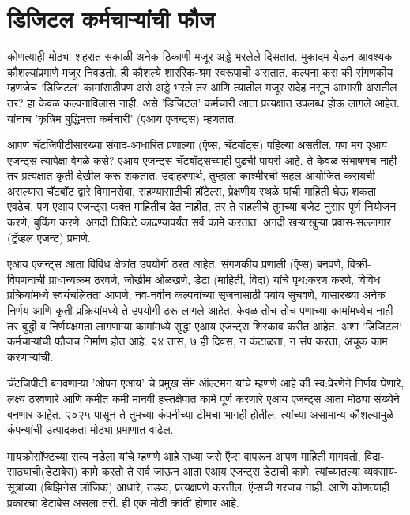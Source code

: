\chapter{डिजिटल कर्मचाऱ्यांची फौज}

कोणत्याही मोठ्या शहरात सकाळी अनेक ठिकाणी मजूर-अड्डे भरलेले दिसतात. मुकादम येऊन आवश्यक कौशल्यांप्रमाणे मजूर निवडतो. ही कौशल्ये शाररिक-श्रम स्वरूपाची असतात. कल्पना करा की संगणकीय म्हणजेच 'डिजिटल' कामांसाठीपण असे अड्डे भरले तर आणि त्यातील मजूर सदेह  नसून आभासी असतील तर? हा केवळ कल्पनाविलास  नाही. असे 'डिजिटल' कर्मचारी आता प्रत्यक्षात उपलब्ध होऊ लागले आहेत. यांनाच 'कृत्रिम बुद्धिमत्ता कर्मचारी' (एआय एजन्ट्स) म्हणतात. 

आपण चॅटजिपीटीसारख्या संवाद-आधारित प्रणाल्या (ऍप्स, चॅटबॉट्स) पहिल्या असतील. पण मग एआय एजन्ट्स त्यापेक्षा वेगळे कसे? एआय एजन्ट्स चॅटबॉट्सच्याही पुढची पायरी आहे. ते केवळ संभाषणच नाही तर प्रत्यक्षात कृती देखील करू शकतात. उदाहरणार्थ, तुम्हाला काश्मीरची सहल आयोजित करायची असल्यास चॅटबॉट द्वारे विमानसेवा, राहण्यासाठीची हॉटेल्स, प्रेक्षणीय स्थळे यांची माहिती घेऊ शकता एवढेच. पण एआय एजन्ट्स फक्त माहितीच देत नाहीत, तर ते सहलीचे तुमच्या बजेट नुसार पूर्ण नियोजन करणे, बुकिंग करणे, अगदी तिकिटे काढण्यापर्यंत सर्व कामे करतात. अगदी खऱ्याखुऱ्या प्रवास-सल्लागार (ट्रॅव्हल एजन्ट) प्रमाणे. 

एआय एजन्ट्स  आता विविध क्षेत्रांत उपयोगी ठरत आहेत. संगणकीय प्रणाली (ऍप्स) बनवणे, विक्री-विपणनाची प्राधान्यक्रम ठरवणे, जोखीम ओळखणे, डेटा (माहिती, विदा) यांचे पृथ:करण करणे, विविध प्रक्रियांमध्ये स्वयंचलितता आणणे, नव-नवीन कल्पनांच्या सृजनासाठी पर्याय सुचवणे, यासारख्या अनेक निर्णय आणि कृती प्रक्रियांमध्ये ते उपयोगी ठरू लागले आहेत. केवळ तोच-तोच पणाच्या कामांमध्येच नाही तर बुद्धी व निर्णयक्षमता लागणाऱ्या कामांमध्ये सुद्धा एआय एजन्ट्स शिरकाव करीत आहेत. अशा 'डिजिटल' कर्मचाऱ्यांची फौजच निर्माण होत आहे. २४ तास, ७ ही दिवस, न कंटाळता, न संप करता, अचूक काम करणाऱ्यांची. 

चॅटजिपीटी बनवणाऱ्या 'ओपन एआय' चे प्रमुख सॅम ऑल्टमन यांचे म्हणणे आहे की स्व:प्रेरणेने निर्णय घेणारे, लक्ष्य ठरवणारे आणि कमीत कमी मानवी हस्तक्षेपात कामे पूर्ण करणारे एआय एजन्ट्स आता मोठ्या संख्येने बनणार आहेत. २०२५ पासून ते तुमच्या कंपनीच्या टीमचा भागही होतील. त्यांच्या असामान्य कौशल्यामुळे कंपन्यांची उत्पादकता मोठ्या प्रमाणात वाढेल. 

मायक्रोसॉफ्टच्या सत्य नडेला यांचे म्हणणे आहे सध्या जसे ऍप्स वापरून आपण माहिती मागवतो, विदा-साठ्याची(डेटाबेस) कामे करतो ते सर्व जाऊन आता एआय एजन्ट्स डेटाची कामे, त्यांच्यातल्या व्यवसाय-सूत्रांच्या (बिझिनेस लॉजिक) आधारे, तडक, प्रत्यक्षपणे करतील. ऍप्सची गरजच नाही. आणि कोणत्याही प्रकारचा डेटाबेस असला तरी. ही एक मोठी क्रांती होणार आहे.

